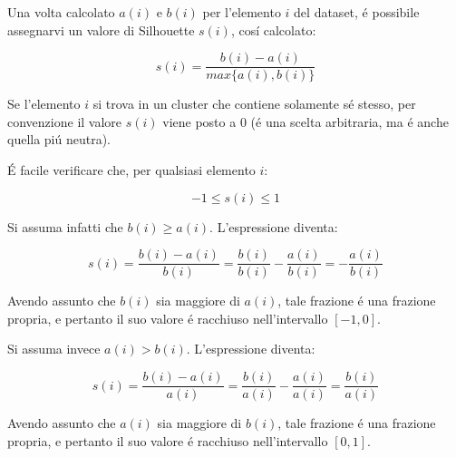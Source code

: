 \documentclass[italian]{article}
\begin{document}
		Una volta calcolato $a(i)$ e $b(i)$ per l'elemento $i$ del dataset, é
		possibile assegnarvi un valore di Silhouette $s(i)$, cosí calcolato:

		\begin{equation}
			s(i) = \frac{b(i) - a(i)}{max\{a(i), b(i)\}}
		\end{equation}

		Se l'elemento $i$ si trova in un cluster che contiene solamente sé stesso,
		per convenzione il valore $s(i)$ viene posto a $0$ (é una scelta arbitraria,
		ma é anche quella piú neutra).

		É facile verificare che, per qualsiasi elemento $i$:

		\begin{equation*}
			-1 \leq s(i) \leq 1
		\end{equation*}

		Si assuma infatti che $b(i) \geq a(i)$. L'espressione diventa:

		\begin{equation*}
			s(i) = \frac{b(i) - a(i)}{b(i)} =
			\frac{b(i)}{b(i)} - \frac{a(i)}{b(i)} =
			- \frac{a(i)}{b(i)}
		\end{equation*}

		Avendo assunto che $b(i)$ sia maggiore di $a(i)$, tale frazione é una
		frazione propria, e pertanto il suo valore é racchiuso nell'intervallo
		$[-1, 0]$.

		Si assuma invece $a(i) > b(i)$. L'espressione diventa:

		\begin{equation*}
			s(i) = \frac{b(i) - a(i)}{a(i)} =
			\frac{b(i)}{a(i)} - \frac{a(i)}{a(i)} =
			\frac{b(i)}{a(i)}
		\end{equation*}

		Avendo assunto che $a(i)$ sia maggiore di $b(i)$, tale frazione é una
		frazione propria, e pertanto il suo valore é racchiuso nell'intervallo
		$[0, 1]$.

\end{document}
